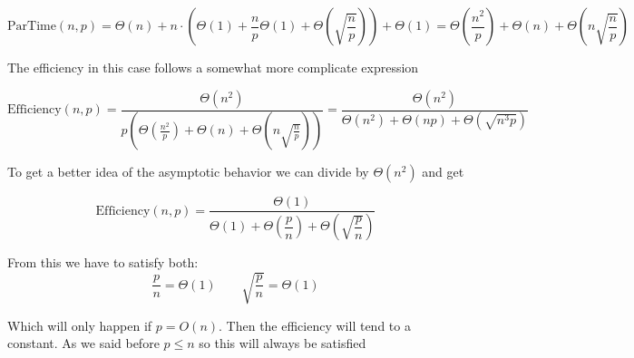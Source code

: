 \documentclass[a4paper]{article}
\begin{document}
\begin{enumerate}[a)]
        \begin{equation}
            \text{ParTime}(n,p) = \Theta(n) + n\cdot \left(\Theta(1) + \frac{n}{p}\Theta(1) + \Theta \left(\sqrt{\frac{n}{p}}\right) \right) + \Theta(1) = \Theta \left(\frac{n^2}{p}\right) + \Theta(n) + \Theta \left(n \sqrt{\frac{n}{p}}\right)
        \end{equation}

        The efficiency in this case follows a somewhat more complicate expression

        \begin{equation}
            \text{Efficiency}(n,p) = \frac{\Theta(n^2)}{p \left(\Theta \left(\frac{n^2}{p}\right) + \Theta(n) + \Theta \left(n \sqrt{\frac{n}{p}}\right) \right)} = \frac{\Theta(n^2)}{\Theta(n^2)+  \Theta(n p) + \Theta(\sqrt{n^3 p})}
        \end{equation}

        To get a better idea of the asymptotic behavior we can divide by $\Theta(n^2)$ and get

        \begin{equation}
            \text{Efficiency}(n,p) = \frac{\Theta(1)}{\Theta(1)+  \Theta \left(\dfrac{p}{n}\right) + \Theta \left(\sqrt{\dfrac{p}{n}}\right)}
        \end{equation}

        From this we have to satisfy both:
        \begin{equation}
           \dfrac{p}{n} = \Theta(1)  \qquad
           \sqrt{\dfrac{p}{n}} = \Theta(1)
        \end{equation}

        Which will only happen if $p = O(n)$. Then the efficiency will tend to a constant. As we said before $p \leq n$ so this will always be satisfied

    \end{enumerate}
\end{document}
